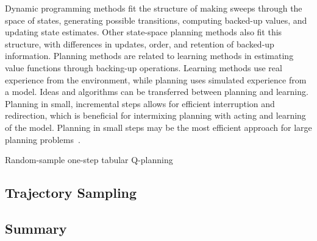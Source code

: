\documentclass[../xlapes02]{subfiles}
\begin{document}
    Dynamic programming methods fit the structure of making sweeps through the space of states, generating possible transitions, computing backed-up values, and updating state estimates.
    Other state-space planning methods also fit this structure, with differences in updates, order, and retention of backed-up information.
    Planning methods are related to learning methods in estimating value functions through backing-up operations.
    Learning methods use real experience from the environment, while planning uses simulated experience from a model.
    Ideas and algorithms can be transferred between planning and learning.
    Planning in small, incremental steps allows for efficient interruption and redirection, which is beneficial for intermixing planning with acting and learning of the model.
    Planning in small steps may be the most efficient approach for large planning problems~\cite{sutton2018reinforcement}.
    \begin{algorithm}[H]
        \label{alg:random-sample-one-step-tabular-q-planning}
        \SetAlgoLined
        \caption{Random-sample one-step tabular Q-planning}
    \end{algorithm}

    \subsection{Trajectory Sampling}\label{subsec:trajectory-sampling}

    \subsection{Summary}\label{subsec:summary}
\end{document}
